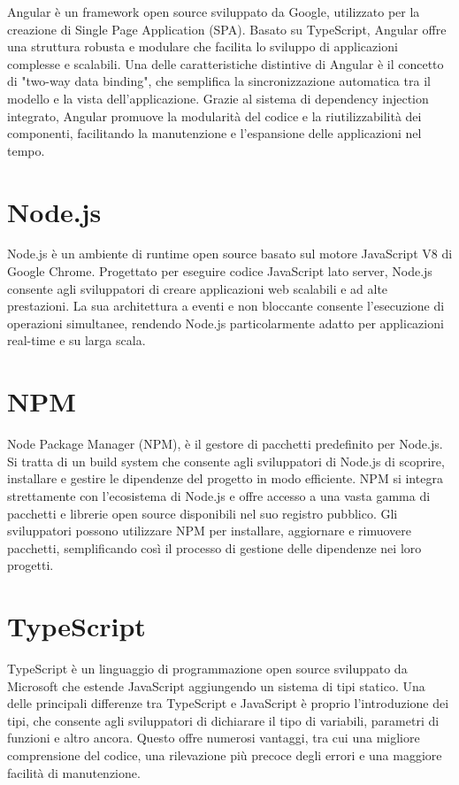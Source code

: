 Angular è un framework open source sviluppato da Google, utilizzato per la creazione di Single Page Application (SPA). Basato su TypeScript, Angular offre una struttura robusta e modulare che facilita lo sviluppo di applicazioni complesse e scalabili. Una delle caratteristiche distintive di Angular è il concetto di "two-way data binding", che semplifica la sincronizzazione automatica tra il modello e la vista dell'applicazione. Grazie al sistema di dependency injection integrato, Angular promuove la modularità del codice e la riutilizzabilità dei componenti, facilitando la manutenzione e l'espansione delle applicazioni nel tempo. 

\section{Node.js}

Node.js è un ambiente di runtime open source basato sul motore JavaScript V8 di Google Chrome. Progettato per eseguire codice JavaScript lato server, Node.js consente agli sviluppatori di creare applicazioni web scalabili e ad alte prestazioni. La sua architettura a eventi e non bloccante consente l'esecuzione di operazioni simultanee, rendendo Node.js particolarmente adatto per applicazioni real-time e su larga scala.

\section{NPM}

Node Package Manager (NPM), è il gestore di pacchetti predefinito per Node.js. Si tratta di un build system che consente agli sviluppatori di Node.js di scoprire, installare e gestire le dipendenze del progetto in modo efficiente. NPM si integra strettamente con l'ecosistema di Node.js e offre accesso a una vasta gamma di pacchetti e librerie open source disponibili nel suo registro pubblico. Gli sviluppatori possono utilizzare NPM per installare, aggiornare e rimuovere pacchetti, semplificando così il processo di gestione delle dipendenze nei loro progetti.

\section{TypeScript}

TypeScript è un linguaggio di programmazione open source sviluppato da Microsoft che estende JavaScript aggiungendo un sistema di tipi statico. Una delle principali differenze tra TypeScript e JavaScript è proprio l'introduzione dei tipi, che consente agli sviluppatori di dichiarare il tipo di variabili, parametri di funzioni e altro ancora. Questo offre numerosi vantaggi, tra cui una migliore comprensione del codice, una rilevazione più precoce degli errori e una maggiore facilità di manutenzione. 

